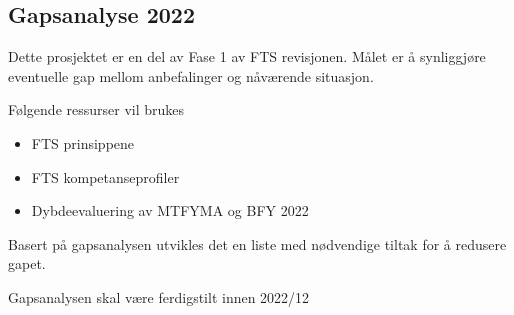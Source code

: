 \subsection{Gapsanalyse 2022}

Dette prosjektet er en del av Fase 1 av FTS revisjonen. Målet er å synliggjøre eventuelle gap mellom anbefalinger og nåværende situasjon.

Følgende ressurser vil brukes

\begin{itemize}
	\item FTS prinsippene
	\item FTS kompetanseprofiler
	\item Dybdeevaluering av MTFYMA og BFY 2022
\end{itemize}

Basert på gapsanalysen utvikles det en liste med nødvendige tiltak for å redusere gapet.

Gapsanalysen skal være ferdigstilt innen 2022/12